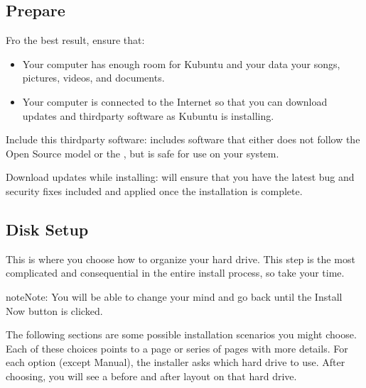 \documentclass[letterpaper,10pt,english]{sphinxmanual}
\begin{document}
\subsection{Prepare}
\label{\detokenize{docs/installation:prepare}}
\sphinxAtStartPar
Fro the best result, ensure that:
\begin{itemize}
\item {} 
\sphinxAtStartPar
Your computer has enough room for Kubuntu and your data \sphinxhyphen{} your songs, pictures, videos, and documents.

\item {} 
\sphinxAtStartPar
Your computer is connected to the Internet so that you can download updates and third\sphinxhyphen{}party software as Kubuntu is installing.

\end{itemize}


\sphinxAtStartPar
Include this third\sphinxhyphen{}party software: includes software that either does not follow the Open Source model or the , but is safe for use on your system.

\sphinxAtStartPar
Download updates while installing: will ensure that you have the latest bug and security fixes included and applied once the installation is complete.


\subsection{Disk Setup}
\label{\detokenize{docs/installation:disk-setup}}
\sphinxAtStartPar
This is where you choose how to organize your hard drive. This step is the most complicated and consequential in the entire install process, so take your time.

\begin{sphinxadmonition}{note}{Note:}
\sphinxAtStartPar
You will be able to change your mind and go back until the Install Now button is clicked.
\end{sphinxadmonition}

\sphinxAtStartPar
The following sections are some possible installation scenarios you might choose. Each of these choices points to a page or series of pages with more details. For each option (except Manual), the installer asks which hard drive to use. After choosing, you will see a before and after layout on that hard drive.
\end{document}
